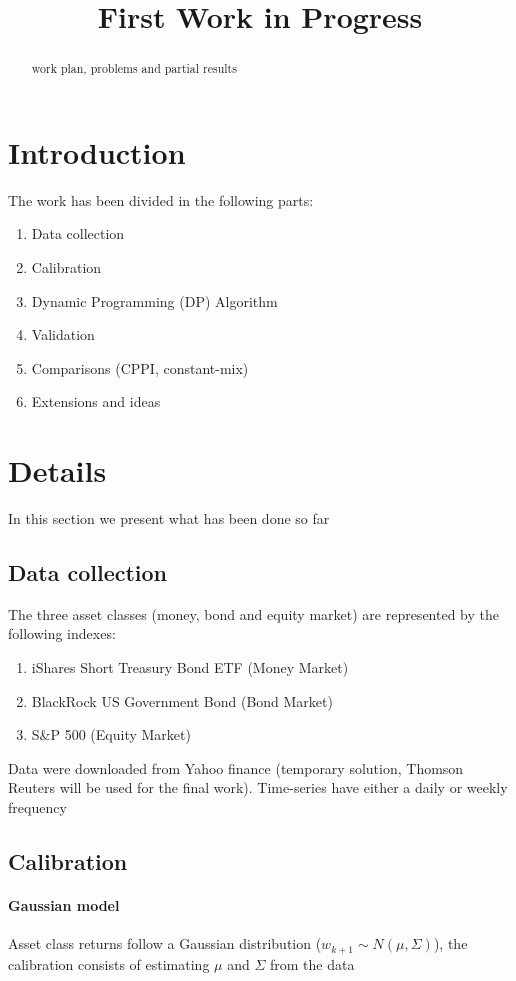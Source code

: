 \documentclass[]{article}
\title{First Work in Progress}
\author{}
\begin{document}
\maketitle

\begin{abstract}
work plan, problems and partial results
\end{abstract}

\section{Introduction}
The work has been divided in the following parts:
\begin{enumerate}
	\item Data collection
	\item Calibration
	\item Dynamic Programming (DP) Algorithm
	\item Validation 
	\item Comparisons (CPPI, constant-mix)
	\item Extensions and ideas
\end{enumerate}

\section{Details}
In this section we present what has been done so far 
\subsection{Data collection}
The three asset classes (money, bond and equity market) are represented by the following indexes:
\begin{enumerate}
	\item iShares Short Treasury Bond ETF (Money Market)
	\item BlackRock US Government Bond (Bond Market)
	\item S\&P 500 (Equity Market)
\end{enumerate}
Data were downloaded from Yahoo finance (temporary solution, Thomson Reuters will be used for the final work).
Time-series have either a daily or weekly frequency
\subsection{Calibration}
\paragraph{Gaussian model}
Asset class returns follow a Gaussian distribution ($ w_{k+1} \sim N(\mu,\Sigma)$), the calibration consists of estimating $ \mu $ and $ \Sigma $ from the data
\end{document}
